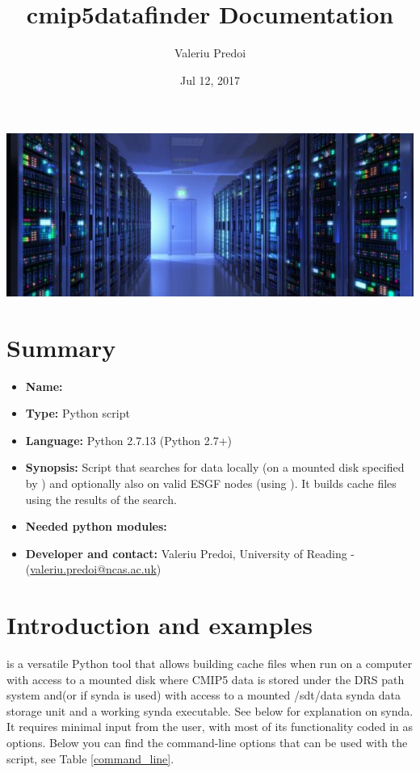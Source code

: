 \documentclass[letterpaper,10pt,english]{sphinxmanual}
\title{cmip5datafinder Documentation}
\author{Valeriu Predoi}
\date{Jul 12, 2017}
\begin{document}
\maketitle
\includegraphics[scale=1.0]{datas}

\section*{Summary}
\label{\detokenize{index:module-cmip5datafinder}}
\begin{itemize}
\item
\textbf{Name:} 
\item
\textbf{Type:} Python script
\item
\textbf{Language:} Python 2.7.13 (Python 2.7+)
\item
\textbf{Synopsis:} Script that searches for data locally (on a mounted disk specified by ) and optionally also on valid ESGF nodes (using ). It builds cache files using the results of the search.
\item
\textbf{Needed python modules:} 
\item
\textbf{Developer and contact:} Valeriu Predoi, University of Reading - (\href{valeriu.predoi@ncas.ac.uk}{valeriu.predoi@ncas.ac.uk})
\end{itemize} 

\section*{Introduction and examples}

 is a versatile Python tool that allows building cache files when run on a computer with access to a mounted disk where CMIP5 data is stored under the DRS path system and(or if synda is used) with access to a mounted /sdt/data synda data storage unit and a working synda executable. See below for explanation on synda. It requires minimal input from the user, with most of its functionality coded in as options. Below you can find the command-line options that can be used with the script, see Table \ref{command_line}.
\end{document}
